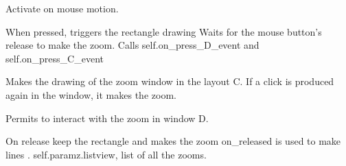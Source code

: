 \documentclass[letterpaper,10pt,openany,oneside]{sphinxmanual}
\begin{document}
\begin{fulllineitems}
\begin{fulllineitems}
\end{fulllineitems}


\begin{fulllineitems}
\label{rst/visu2d:Visu.canvas_event.CANVAS_EVENT.on_motion}
Activate on mouse motion.

\end{fulllineitems}


\begin{fulllineitems}
\label{rst/visu2d:Visu.canvas_event.CANVAS_EVENT.on_press}
When pressed, triggers the rectangle drawing
Waits for the mouse button's release to make the zoom. 
Calls self.on\_press\_D\_event and self.on\_press\_C\_event

\end{fulllineitems}


\begin{fulllineitems}
\label{rst/visu2d:Visu.canvas_event.CANVAS_EVENT.on_press_C_event}
Makes the drawing of the zoom window in the layout C.
If a click is produced again in the window, it makes the zoom.

\end{fulllineitems}


\begin{fulllineitems}
\label{rst/visu2d:Visu.canvas_event.CANVAS_EVENT.on_press_D_event}
Permits to interact with the zoom in window D.

\end{fulllineitems}


\begin{fulllineitems}
\label{rst/visu2d:Visu.canvas_event.CANVAS_EVENT.on_release}
On release keep the rectangle and makes the zoom
on\_released is used to make lines .
self.paramz.listview, list of all the zooms.


\end{fulllineitems}
\end{fulllineitems}
\end{document}
